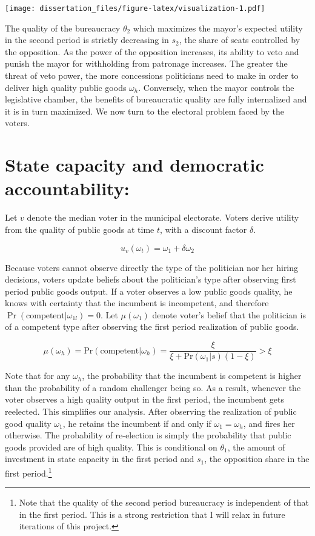 \documentclass[12pt,]{book}
\let\rmarkdownfootnote\footnote%
\def\footnote{\protect\rmarkdownfootnote}
\begin{document}
\texttt{[image: dissertation\_files/figure-latex/visualization-1.pdf]}

The quality of the bureaucracy \(\theta_2\) which maximizes the mayor's expected utility in the second period is strictly decreasing in \(s_2\), the share of seats controlled by the opposition. As the power of the opposition increases, its ability to veto and punish the mayor for withholding from patronage increases. The greater the threat of veto power, the more concessions politicians need to make in order to deliver high quality public goods \(\omega_h\). Conversely, when the mayor controls the legislative chamber, the benefits of bureaucratic quality are fully internalized and it is in turn maximized. We now turn to the electoral problem faced by the voters.

\hypertarget{state-capacity-and-democratic-accountability}{%
\section{State capacity and democratic accountability:}\label{state-capacity-and-democratic-accountability}}

Let \(v\) denote the median voter in the municipal electorate. Voters derive utility from the quality of public goods at time \(t\), with a discount factor \(\delta\).

\[u_v(\omega_t) = \omega_1 + \delta \omega_2\]

Because voters cannot observe directly the type of the politician nor her hiring decisions, voters update beliefs about the politician's type after observing first period public goods output. If a voter observes a low public goods quality, he knows with certainty that the incumbent is incompetent, and therefore \(\Pr(\text{competent}|\omega_{1l}) = 0\). Let \(\mu(\omega_1)\) denote voter's belief that the politician is of a competent type after observing the first period realization of public goods.

\[\mu(\omega_h) = \text{Pr}(\text{competent}| \omega_h) = \frac{\xi}{\xi + \text{Pr}(\omega_1|s)(1-\xi)}>\xi\]

Note that for any \(\omega_h\), the probability that the incumbent is competent is higher than the probability of a random challenger being so. As a result, whenever the voter observes a high quality output in the first period, the incumbent gets reelected. This simplifies our analysis. After observing the realization of public good quality \(\omega_1\), he retains the incumbent if and only if \(\omega_1 = \omega_h\), and fires her otherwise. The probability of re-election is simply the probability that public goods provided are of high quality. This is conditional on \(\theta_1\), the amount of investment in state capacity in the first period and \(s_1\), the opposition share in the first period.\footnote{Note that the quality of the second period bureaucracy is independent of that in the first period. This is a strong restriction that I will relax in future iterations of this project.}
\end{document}
